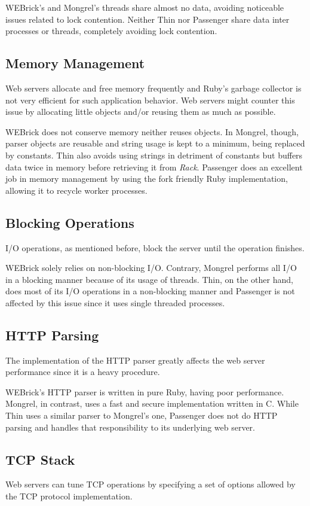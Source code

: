 WEBrick's and Mongrel's threads share almost no data, avoiding noticeable issues related to lock contention. Neither Thin nor Passenger share data inter processes or threads, completely avoiding lock contention.

\subsection{Memory Management}
Web servers allocate and free memory frequently and Ruby's garbage collector is not very efficient for such application behavior. Web servers might counter this issue by allocating little objects and/or reusing them as much as possible.

WEBrick does not conserve memory neither reuses objects. In Mongrel, though, parser objects are reusable and string usage is kept to a minimum, being replaced by constants. Thin also avoids using strings in detriment of constants but buffers data twice in memory before retrieving it from \textit{Rack}. Passenger does an excellent job in memory management by using the fork friendly Ruby implementation, allowing it to recycle worker processes.

\subsection{Blocking Operations}
I/O operations, as mentioned before, block the server until the operation finishes.

WEBrick solely relies on non-blocking I/O. Contrary, Mongrel performs all I/O in a blocking manner because of its usage of threads. Thin, on the other hand, does most of its I/O operations in a non-blocking manner and Passenger is not affected by this issue since it uses single threaded processes.

\subsection{HTTP Parsing}
The implementation of the HTTP parser greatly affects the web server performance since it is a heavy procedure.

WEBrick's HTTP parser is written in pure Ruby, having poor performance. Mongrel, in contrast, uses a fast and secure implementation written in C. While Thin uses a similar parser to Mongrel's one, Passenger does not do HTTP parsing and handles that responsibility to its underlying web server.

\subsection{TCP Stack}
Web servers can tune TCP operations by specifying a set of options allowed by the TCP protocol implementation.

